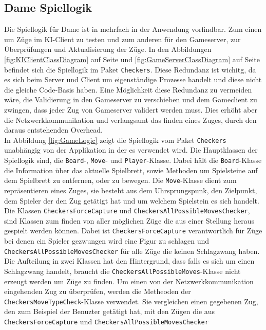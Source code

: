 \documentclass[12pt,a4paper,bibliography=totocnumbered,listof=totocnumbered]{article}
\begin{document}
\subsection{Dame Spiellogik}
\label{chap:Spiellogik}
Die Spiellogik für Dame ist in mehrfach in der Anwendung vorfindbar. Zum einen um Züge im KI-Client zu testen und zum anderen
für den Gameserver, zur Überprüfungen und Aktualisierung der Züge. In den Abbildungen \ref{fig:KIClientClassDiagram} auf Seite \pageref{fig:KIClientClassDiagram} 
und \ref{fig:GameServerClassDiagram} auf Seite \pageref{fig:GameServerClassDiagram}
befindet sich die Spiellogik im Paket \texttt{Checkers}. Diese Redundanz ist wichitg, da es sich beim Server und Client um eigenständige Prozesse handelt 
und diese nicht die gleiche Code-Basis haben. Eine Möglichkeit diese Redundanz zu vermeiden wäre, die Validierung in den Gameserver zu verschieben und 
dem Gameclient zu zwingen, dass jeder Zug von Gameserver validert werden muss. Dies erhöht aber die Netzwerkkommunikation und verlangsamt das finden eines Zuges, 
durch den daraus entstehenden Overhead.
\\
In Abbildung \ref{fig:GameLogic} zeigt die Spiellogik vom Paket \texttt{Checkers} unabhängig von der Applikation in der es verwendet wird.
Die Hauptklassen der Spiellogik sind, die \texttt{Board}-, \texttt{Move}- und \texttt{Player}-Klasse. Dabei hält die \texttt{Board}-Klasse die Information über das aktuelle Spielbrett, sowie 
Methoden um Spielsteine auf dem Spielbrett zu entfernen, oder zu bewegen. 
Die \texttt{Move}-Klasse dient zum repräsentieren eines Zuges, sie besteht aus dem 
Uhrsprungspunk, den Zielpunkt, dem Spieler der den Zug getätigt hat und um welchem Spielstein es sich handelt. 
\\
Die Klassen \texttt{CheckersForceCapture} und \texttt{CheckersAllPossibleMovesChecker}, sind Klassen zum finden von aller möglichen Züge die aus einer Stellung heraus gespielt werden
können. Dabei ist \texttt{CheckersForceCapture} verantwortlich für Züge bei denen ein Spieler gezwungen wird eine Figur zu schlagen und \texttt{CheckersAllPossibleMovesChecker} 
für alle Züge die keinen Schlagzwang haben. Die Aufteilung in zwei Klassen hat den Hintergrund, dass falls es sich um einen Schlagzwang handelt, braucht 
die \texttt{CheckersAllPossibleMoves}-Klasse nicht erzeugt werden um Züge zu finden. Um einen von der Netzwerkkommunikation eingehenden Zug zu überprüfen, 
werden die Metheoden der \texttt{CheckersMoveTypeCheck}-Klasse verwendet. Sie vergleichen einen gegebenen Zug, 
den zum Beispiel der Benuzter getätigt hat, mit den Zügen die aus \texttt{CheckersForceCapture} und \texttt{CheckersAllPossibleMovesChecker}
\end{document}
